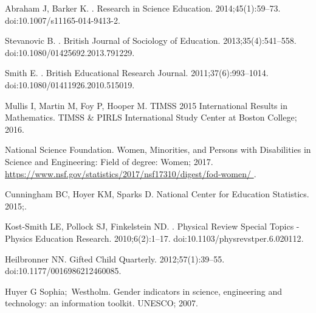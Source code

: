 \begin{thebibliography}{10}

Abraham J, Barker K.
.
\newblock Research in Science Education. 2014;45(1):59--73.
\newblock doi:{10.1007/s11165-014-9413-2}.

Stevanovic B.
.
\newblock British Journal of Sociology of Education. 2013;35(4):541--558.
\newblock doi:{10.1080/01425692.2013.791229}.

Smith E.
.
\newblock British Educational Research Journal. 2011;37(6):993--1014.
\newblock doi:{10.1080/01411926.2010.515019}.

Mullis I, Martin M, Foy P, Hooper M. TIMSS 2015 International Results in
  Mathematics. TIMSS \& PIRLS International Study Center at Boston College;
  2016.

{National Science Foundation}. Women, Minorities, and Persons with Disabilities
  in Science and Engineering: Field of degree: Women; 2017.
\newblock \url{https://www.nsf.gov/statistics/2017/nsf17310/digest/fod-women/
  }.

Cunningham BC, Hoyer KM, Sparks D.
\newblock National Center for Education Statistics. 2015;.

Kost-Smith LE, Pollock SJ, Finkelstein ND.
.
\newblock Physical Review Special Topics - Physics Education Research.
  2010;6(2):1--17.
\newblock doi:{10.1103/physrevstper.6.020112}.

Heilbronner NN.
\newblock Gifted Child Quarterly. 2012;57(1):39--55.
\newblock doi:{10.1177/0016986212460085}.

Huyer G Sophia;~Westholm.
\newblock Gender indicators in science, engineering and technology: an
  information toolkit.
\newblock UNESCO; 2007.


\end{thebibliography}
